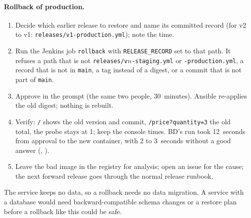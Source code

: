 \paragraph{Rollback of production.}
\begin{enumerate}
\item Decide which earlier release to restore and name its committed record (for v2 to v1: \texttt{releases/v1-production.yml}); note the time.
\item Run the Jenkins job \texttt{rollback} with \texttt{RELEASE\_RECORD} set to that path. It refuses a path that is not \texttt{releases/v}$n$\texttt{-staging.yml} or \texttt{-production.yml}, a record that is not in \texttt{main}, a tag instead of a digest, or a commit that is not part of \texttt{main}.
\item Approve in the prompt (the same two people, 30~minutes). Ansible re-applies the old digest; nothing is rebuilt.
\item Verify: \texttt{/} shows the old version and commit, \texttt{/price?quantity=3} the old total, the probe stays at 1; keep the console times. BD's run took 12~seconds from approval to the new container, with 2 to 3~seconds without a good answer (, ).
\item Leave the bad image in the registry for analysis; open an issue for the cause; the next forward release goes through the normal release runbook.
\end{enumerate}
The service keeps no data, so a rollback needs no data migration. A service with a database would need backward-compatible schema changes or a restore plan before a rollback like this could be safe.


